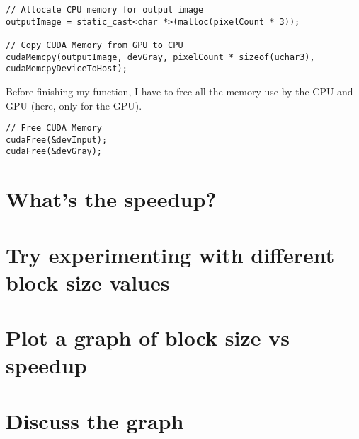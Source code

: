 \documentclass[11pt]{article} %
\begin{document}
\lstset{language=C}
\begin{lstlisting}
// Allocate CPU memory for output image
outputImage = static_cast<char *>(malloc(pixelCount * 3));

// Copy CUDA Memory from GPU to CPU
cudaMemcpy(outputImage, devGray, pixelCount * sizeof(uchar3), cudaMemcpyDeviceToHost);
\end{lstlisting}

Before finishing my function, I have to free all the memory use by the CPU and GPU (here, only for the GPU).

\lstset{language=C}
\begin{lstlisting}
// Free CUDA Memory
cudaFree(&devInput);
cudaFree(&devGray);
\end{lstlisting}

\section{What’s the speedup?}

\section{Try experimenting with different block size values}

\section{Plot a graph of block size vs speedup}

\section{Discuss the graph}
\end{document}
